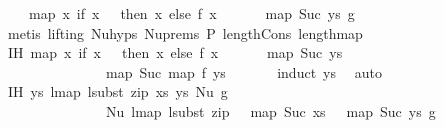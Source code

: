 \begin{isabellebody}
\ \ \ \ {\isacharparenleft}{\kern0pt}map\ {\isacharparenleft}{\kern0pt}{\isasymlambda}x{\isachardot}{\kern0pt}\ if\ x\ {\isacharequal}{\kern0pt}\ {}\ then\ x\ else\ {\isacharparenleft}{\kern0pt}f\ {\isacharparenleft}{\kern0pt}x\ {\isacharminus}{\kern0pt}\ {}{\isacharparenright}{\kern0pt}\ {\isacharplus}{\kern0pt}\ {}{\isacharparenright}{\kern0pt}{\isacharparenright}{\kern0pt}\ {\isacharparenleft}{\kern0pt}{}\ {\isacharhash}{\kern0pt}\ map\ Suc\ ys{\isacharparenright}{\kern0pt}{\isacharparenright}{\kern0pt}{\isacharparenright}{\kern0pt}{\isacharparenright}{\kern0pt}\ g{\isachardoublequoteclose}\isanewline
\ \ \ \isamarkupfalse%
\ {\isacharparenleft}{\kern0pt}metis\ {\isacharparenleft}{\kern0pt}lifting{\isacharparenright}{\kern0pt}\ Nu{\isachardot}{\kern0pt}hyps\ Nu{\isachardot}{\kern0pt}prems{\isacharparenleft}{\kern0pt}{}{\isacharparenright}{\kern0pt}\ P{}\ length{\isacharunderscore}{\kern0pt}Cons\ length{\isacharunderscore}{\kern0pt}map{\isacharparenright}{\kern0pt}\isanewline
\isanewline
\ \ \isamarkupfalse%
\ IH{}{\isacharcolon}{\kern0pt}\ {\isachardoublequoteopen}map\ {\isacharparenleft}{\kern0pt}{\isasymlambda}x{\isachardot}{\kern0pt}\ if\ x\ {\isacharequal}{\kern0pt}\ {}\ then\ x\ else\ {\isacharparenleft}{\kern0pt}f\ {\isacharparenleft}{\kern0pt}x\ {\isacharminus}{\kern0pt}\ {}{\isacharparenright}{\kern0pt}\ {\isacharplus}{\kern0pt}\ {}{\isacharparenright}{\kern0pt}{\isacharparenright}{\kern0pt}\ {\isacharparenleft}{\kern0pt}{}\ {\isacharhash}{\kern0pt}\ map\ Suc\ ys{\isacharparenright}{\kern0pt}\ {\isacharequal}{\kern0pt}\isanewline
\ \ \ \ \ \ \ \ \ \ \ \ \ {}\ {\isacharhash}{\kern0pt}\ map\ Suc\ {\isacharparenleft}{\kern0pt}map\ f\ ys{\isacharparenright}{\kern0pt}{\isachardoublequoteclose}\isanewline
\ \ \ \ \ \isamarkupfalse%
\ {\isacharparenleft}{\kern0pt}induct\ ys{\isacharparenright}{\kern0pt}\ \isamarkupfalse%
\ auto\isanewline
\isanewline
\ \ \ \isamarkupfalse%
\ IH{}{\isacharcolon}{\kern0pt}\ {\isachardoublequoteopen}{\isasymforall}ys{\isachardot}{\kern0pt}\ lmap\ {\isacharparenleft}{\kern0pt}lsubst\ {\isacharparenleft}{\kern0pt}zip\ xs\ ys{\isacharparenright}{\kern0pt}{\isacharparenright}{\kern0pt}\ {\isacharparenleft}{\kern0pt}Nu\ g{\isacharparenright}{\kern0pt}\ {\isacharequal}{\kern0pt}\isanewline
\ \ \ \ \ \ \ \ \ \ \ \ \ \ \ Nu\ {\isacharparenleft}{\kern0pt}lmap\ {\isacharparenleft}{\kern0pt}lsubst\ {\isacharparenleft}{\kern0pt}zip\ {\isacharparenleft}{\kern0pt}{}\ {\isacharhash}{\kern0pt}\ map\ Suc\ xs{\isacharparenright}{\kern0pt}\ {\isacharparenleft}{\kern0pt}{}\ {\isacharhash}{\kern0pt}\ map\ Suc\ ys{\isacharparenright}{\kern0pt}{\isacharparenright}{\kern0pt}{\isacharparenright}{\kern0pt}\ g{\isacharparenright}{\kern0pt}{\isachardoublequoteclose}\isanewline

\end{isabellebody}
